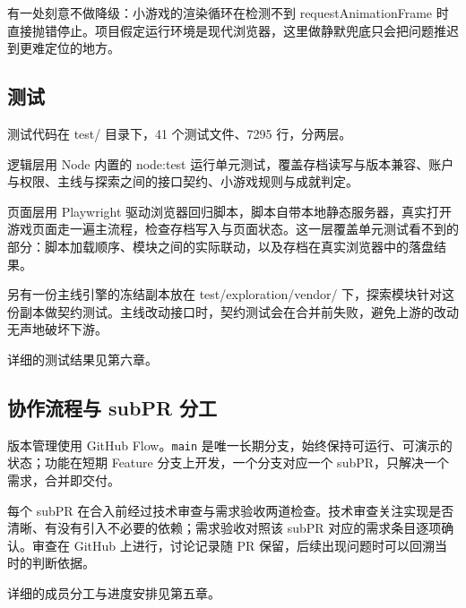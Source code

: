 有一处刻意不做降级：小游戏的渲染循环在检测不到 requestAnimationFrame 时直接抛错停止。项目假定运行环境是现代浏览器，这里做静默兜底只会把问题推迟到更难定位的地方。

\subsection{测试}

测试代码在 test/ 目录下，41 个测试文件、7295 行，分两层。

逻辑层用 Node 内置的 node:test 运行单元测试，覆盖存档读写与版本兼容、账户与权限、主线与探索之间的接口契约、小游戏规则与成就判定。

页面层用 Playwright 驱动浏览器回归脚本，脚本自带本地静态服务器，真实打开游戏页面走一遍主流程，检查存档写入与页面状态。这一层覆盖单元测试看不到的部分：脚本加载顺序、模块之间的实际联动，以及存档在真实浏览器中的落盘结果。

另有一份主线引擎的冻结副本放在 test/exploration/vendor/ 下，探索模块针对这份副本做契约测试。主线改动接口时，契约测试会在合并前失败，避免上游的改动无声地破坏下游。

详细的测试结果见第六章。

\subsection{协作流程与 subPR 分工}

版本管理使用 GitHub Flow。\texttt{main} 是唯一长期分支，始终保持可运行、可演示的状态；功能在短期 Feature 分支上开发，一个分支对应一个 subPR，只解决一个需求，合并即交付。

每个 subPR 在合入前经过技术审查与需求验收两道检查。技术审查关注实现是否清晰、有没有引入不必要的依赖；需求验收对照该 subPR 对应的需求条目逐项确认。审查在 GitHub 上进行，讨论记录随 PR 保留，后续出现问题时可以回溯当时的判断依据。

详细的成员分工与进度安排见第五章。
